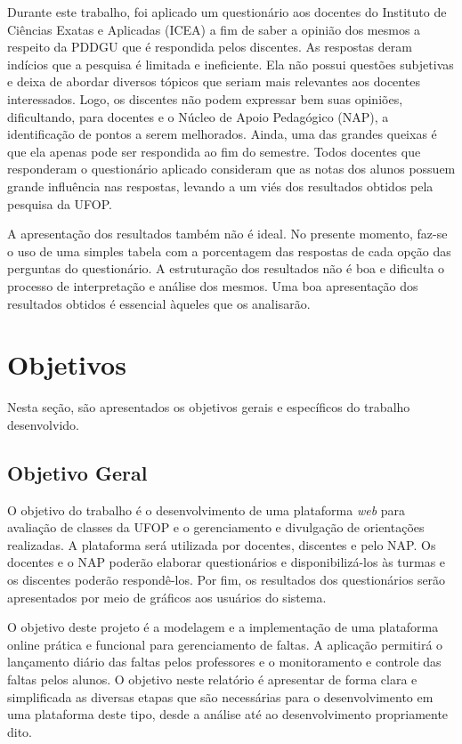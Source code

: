 \documentclass[
  12pt,       %
  openright,      %
  oneside,      %
  a4paper,      %
  english,      %
  french,        %
  spanish,     %
  brazil        %
  ]{abntex2-decsi}
\begin{document}
    Durante este trabalho, foi aplicado um questionário aos docentes do Instituto de Ciências Exatas e Aplicadas (ICEA) a fim de saber a opinião dos mesmos a respeito da PDDGU que é respondida pelos discentes. As respostas deram indícios que a pesquisa é limitada e ineficiente. Ela não possui questões subjetivas e deixa de abordar diversos tópicos que seriam mais relevantes aos docentes interessados. Logo, os discentes não podem expressar bem suas opiniões, dificultando, para docentes e o Núcleo de Apoio Pedagógico (NAP), a identificação de pontos a serem melhorados. Ainda, uma das grandes queixas é que ela apenas pode ser respondida ao fim do semestre. Todos docentes que responderam o questionário aplicado consideram que as notas dos alunos possuem grande influência nas respostas, levando a um viés dos resultados obtidos pela pesquisa da UFOP. 

    A apresentação dos resultados também não é ideal. No presente momento, faz-se o uso de uma simples tabela com a porcentagem das respostas de cada opção das perguntas do questionário. A estruturação dos resultados não é boa e dificulta o processo de interpretação e análise dos mesmos. Uma boa apresentação dos resultados obtidos é essencial àqueles que os analisarão.

    \section{Objetivos}

        Nesta seção, são apresentados os objetivos gerais e específicos do trabalho desenvolvido.

        \subsection{Objetivo Geral}

    O objetivo do trabalho é o desenvolvimento de uma plataforma \textit{web} para avaliação de classes da UFOP e o gerenciamento e divulgação de orientações realizadas. A plataforma será utilizada por docentes, discentes e pelo NAP. Os docentes e o NAP poderão elaborar questionários e disponibilizá-los às turmas e os discentes poderão respondê-los. Por fim, os resultados dos questionários serão apresentados por meio de gráficos aos usuários do sistema.
    
    O objetivo deste projeto é a modelagem e a implementação de uma plataforma online prática e funcional para gerenciamento de faltas. A aplicação permitirá o lançamento diário das faltas pelos professores e o monitoramento e controle das faltas pelos alunos. O objetivo neste relatório é apresentar de forma clara e simplificada as diversas etapas que são necessárias para o desenvolvimento em uma plataforma deste tipo, desde a análise até ao desenvolvimento propriamente dito.
\end{document}
